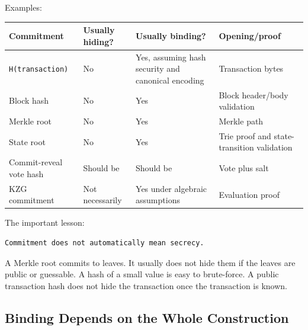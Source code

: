 Examples:

{\def\LTcaptype{none} %
\begin{longtable}[]{@{}
  >{\raggedright\arraybackslash}p{}
  >{\raggedright\arraybackslash}p{}
  >{\raggedright\arraybackslash}p{}
  >{\raggedright\arraybackslash}p{}@{}}
\toprule\noalign{}
\begin{minipage}[b]{\linewidth}\raggedright
Commitment
\end{minipage} & \begin{minipage}[b]{\linewidth}\raggedright
Usually hiding?
\end{minipage} & \begin{minipage}[b]{\linewidth}\raggedright
Usually binding?
\end{minipage} & \begin{minipage}[b]{\linewidth}\raggedright
Opening/proof
\end{minipage} \\
\midrule\noalign{}
\endhead
\bottomrule\noalign{}
\endlastfoot
\passthrough{\lstinline!H(transaction)!} & No & Yes, assuming hash
security and canonical encoding & Transaction bytes \\
Block hash & No & Yes & Block header/body validation \\
Merkle root & No & Yes & Merkle path \\
State root & No & Yes & Trie proof and state-transition validation \\
Commit-reveal vote hash & Should be & Should be & Vote plus salt \\
KZG commitment & Not necessarily & Yes under algebraic assumptions &
Evaluation proof \\
\end{longtable}
}

The important lesson:

\begin{lstlisting}
Commitment does not automatically mean secrecy.
\end{lstlisting}

A Merkle root commits to leaves. It usually does not hide them if the
leaves are public or guessable. A hash of a small value is easy to
brute-force. A public transaction hash does not hide the transaction
once the transaction is known.

\subsection{Binding Depends on the Whole Construction}

